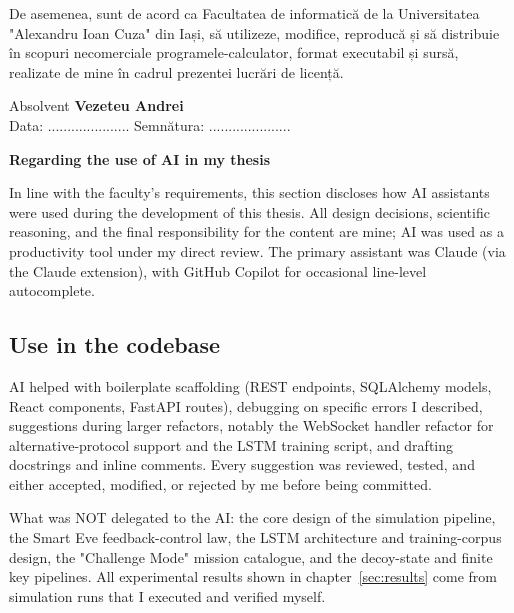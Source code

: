 \documentclass[12pt, a4paper]{article}
\begin{document}
De asemenea, sunt de acord ca Facultatea de informatică de la Universitatea "Alexandru Ioan Cuza" din Iași, să utilizeze, modifice, reproducă și să distribuie în scopuri necomerciale programele-calculator, format executabil și sursă, realizate de mine în cadrul prezentei lucrări de licență.

\begin{flushright}
    Absolvent \textbf{Vezeteu Andrei} \\
    \vspace{0.5cm}
    Data: ..................... \hspace{6cm} Semnătura: .....................
\end{flushright}
\vspace*{\fill}
\pagebreak


\newpage
\thispagestyle{plain}
\begin{center}
  {\Large \textbf{Regarding the use of AI in my thesis}}
\end{center}
\vspace{10pt}

\noindent
In line with the faculty's requirements, this section discloses how AI
assistants were used during the development of this thesis. All design
decisions, scientific reasoning, and the final responsibility for the
content are mine; AI was used as a productivity tool under my direct
review. The primary assistant was Claude (via the Claude
extension), with GitHub Copilot for occasional line-level
autocomplete.

\subsection*{Use in the codebase}

AI helped with boilerplate scaffolding (REST endpoints, SQLAlchemy
models, React components, FastAPI routes), debugging on specific errors
I described, suggestions during larger refactors, notably the
WebSocket handler refactor for alternative-protocol support and the
LSTM training script, and drafting docstrings and inline comments.
Every suggestion was reviewed, tested, and either accepted, modified,
or rejected by me before being committed.

What was NOT delegated to the AI: the core design of the
simulation pipeline, the Smart Eve feedback-control law, the LSTM
architecture and training-corpus design, the "Challenge Mode" mission
catalogue, and the decoy-state and finite key pipelines. All
experimental results shown in chapter~\ref{sec:results} come from simulation
runs that I executed and verified myself.
\end{document}
